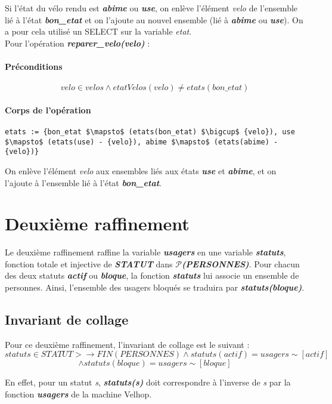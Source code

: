 \documentclass[12pt]{article}
\begin{document}
Si l'état du vélo rendu est \textit{\textbf{abime}} ou \textit{\textbf{use}}, on enlève l'élément \textit{velo} de l'ensemble lié à l'état \textit{\textbf{bon\_etat}} et on l'ajoute au nouvel ensemble (lié à \textit{\textbf{abime}} ou \textit{\textbf{use}}). On a pour cela utilisé un SELECT sur la variable \textit{etat}. \\

Pour l'opération \textit{\textbf{reparer\_velo(velo)}} :
\paragraph{Préconditions}
\[ velo \in velos \land etatVelos(velo) \neq etats(bon\_etat) \]
\paragraph{Corps de l'opération}
\textbf{}
\begin{lstlisting}[mathescape]
  etats := {bon_etat $\mapsto$ (etats(bon_etat) $\bigcup$ {velo}), use $\mapsto$ (etats(use) - {velo}), abime $\mapsto$ (etats(abime) - {velo})}
\end{lstlisting}

On enlève l'élément \textit{velo} aux ensembles liés aux états \textit{\textbf{use}} et \textit{\textbf{abime}}, et on l'ajoute à l'ensemble lié à l'état \textit{\textbf{bon\_etat}}.
\newpage
\section{Deuxième raffinement}
Le deuxième raffinement raffine la variable \textit{\textbf{usagers}} en une variable \textit{\textbf{statuts}}, fonction totale et injective de \textit{\textbf{STATUT}} dans \textit{\textbf{$\mathcal{P}$(PERSONNES)}}. Pour chacun des deux statuts \textit{\textbf{actif}} ou \textit{\textbf{bloque}}, la fonction \textit{\textbf{statuts}} lui associe un ensemble de personnes. Ainsi, l'ensemble des usagers bloqués se traduira par \textit{\textbf{statuts(bloque)}}.
\subsection{Invariant de collage}
Pour ce deuxième raffinement, l'invariant de collage est le suivant : \\
\[ statuts \in STATUT >\rightarrow FIN(PERSONNES) \land statuts(actif) = usagers\sim[{actif}] \]
\[ \land statuts(bloque) = usagers\sim[{bloque}] \]

En effet, pour un statut \textit{s}, \textit{\textbf{statuts(s)}} doit correspondre à l'inverse de \textit{s} par la fonction \textit{\textbf{usagers}} de la machine Velhop.
\end{document}
